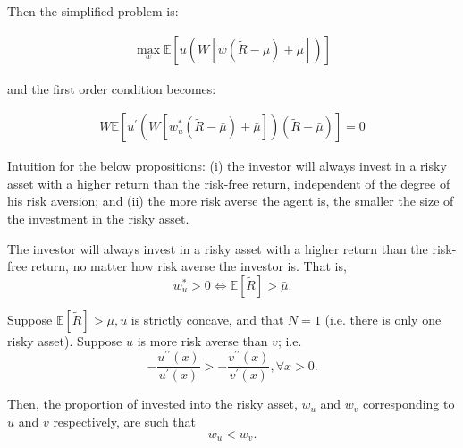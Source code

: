 \documentclass[10pt]{article}
\begin{document}
Then the simplified problem is:

\begin{align}
    \max _w \mathbb{E}[u(W[w(\tilde{R}-\bar{\mu})+\bar{\mu}])]
\end{align}

and the first order condition becomes:

\begin{align}
    W \mathbb{E}\left[u^{\prime}\left(W\left[w_u^*(\tilde{R}-\bar{\mu})+\bar{\mu}\right]\right)(\tilde{R}-\bar{\mu})\right]=0
\end{align}

Intuition for the below propositions: 
(i) the investor will always invest in a risky asset with a higher return than the risk-free return, independent of the degree of his risk aversion; and (ii) the more risk averse the agent is, the smaller the size of the investment in the risky asset.

\begin{proposition} 
    The investor will always invest in a risky asset with a higher return than the risk-free return, no matter how risk averse the investor is. That is,
    $$
    w_u^*>0 \Leftrightarrow \mathbb{E}[\tilde{R}]>\bar{\mu} .
    $$ 
\end{proposition}

\begin{proposition} 
    Suppose $\mathbb{E}[\tilde{R}]>\bar{\mu}, u$ is strictly concave, and that $N=1$ (i.e. there is only one risky asset). Suppose $u$ is more risk averse than $v$; i.e.
    $$
    -\frac{u^{\prime \prime}(x)}{u^{\prime}(x)}>-\frac{v^{\prime \prime}(x)}{v^{\prime}(x)}, \forall x>0 .
    $$
    
    Then, the proportion of invested into the risky asset, $w_u$ and $w_v$ corresponding to $u$ and $v$ respectively, are such that
    $$
    w_u<w_v .
    $$ 
\end{proposition}
\end{document}
